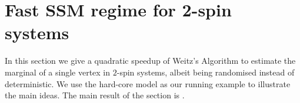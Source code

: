 \documentclass[11pt,a4paper]{amsart}
\newcommand{\eps}{\varepsilon}
\newtheorem{theorem}{Theorem}
\theoremstyle{definition}
\theoremstyle{remark}
\begin{document}
\section{Fast SSM regime for 2-spin systems}
In this section we give a quadratic speedup of Weitz's Algorithm to estimate the marginal of a single vertex in $2$-spin systems, albeit being randomised instead of deterministic.
We use the hard-core model as our running example to illustrate the main ideas.
The main result of the section is .

\end{document}
